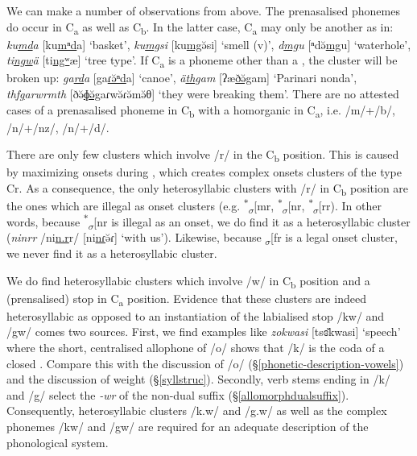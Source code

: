 
We can make a number of observations from  above. The prenasalised phonemes do occur in C\textsubscript{a} as well as C\textsubscript{b}. In the latter case, C\textsubscript{a} may only be another  as in: \emph{ku\uline{md}a} [ku\uline{mⁿd}a] `basket', \emph{ku\uline{mg}si} [ku\uline{m{\ᵑ}g}ə̆si] `smell (v)', \emph{d\uline{mg}u} [ⁿdə̆\uline{m{\ᵑ}g}u] `waterhole', \emph{ti\uline{ngw}ä} [ti\uline{n{\ᵑ}gʷ}æ] `tree type'. If C\textsubscript{a} is a phoneme other than a , the cluster will be broken up: \emph{ga\uline{rd}a} [{\ᵑ}ga\uline{ɾə̆ⁿd}a] `canoe', \emph{ä\uline{thg}am} [ʔæ\uline{ðə̆{\ᵑ}g}am] `Parinari nonda', \emph{th\uline{fg}arwrmth} [ðə̆\uline{ɸə̆{\ᵑ}g}aɾwə̆ɾə̆mə̆θ] `they were breaking them'. There are no attested cases of a prenasalised phoneme in C\textsubscript{b} with a homorganic  in C\textsubscript{a}, i.e. /m/+/b/, /n/+/nz/, /n/+/d/.%

There are only few clusters which involve /r/ in the C\textsubscript{b} position. This is caused by maximizing onsets during , which creates complex onsets clusters of the type Cr. As a consequence, the only heterosyllabic clusters with /r/ in C\textsubscript{b} position are the ones which are illegal as onset clusters (e.g. \textsuperscript{$\ast$}\textsubscript{$\sigma$}[mr, \textsuperscript{$\ast$}\textsubscript{$\sigma$}[nr, \textsuperscript{$\ast$}\textsubscript{$\sigma$}[rr). In other words, because \textsuperscript{$\ast$}\textsubscript{$\sigma$}[nr is illegal as an onset, we do find it as a heterosyllabic cluster (\emph{ninrr} /ni\uline{n.r}r/ [ni\uline{nɾ}ə̆ɾ] `with us'). Likewise, because \textsubscript{$\sigma$}[fr is a legal onset cluster, we never find it as a heterosyllabic cluster.%

We do find heterosyllabic clusters which involve /w/ in C\textsubscript{b} position and a  (prensalised) stop in  C\textsubscript{a} position. Evidence that these clusters are indeed heterosyllabic as opposed to an instantiation of the labialised  stop /kw/ and /gw/ comes two sources. First, we find examples like \emph{zokwasi} [tsɞ̆kwasi] `speech' where the short, centralised allophone of /o/ shows that /k/ is the coda of a closed . Compare this with the discussion of /o/ (\S{}\ref{phonetic-description-vowels}) and the discussion of  weight (\S{}\ref{syllstruc}). Secondly, verb stems ending in /k/ and /g/ select the \emph{-wr}  of the non-dual suffix (\S{}\ref{allomorphdualsuffix}). Consequently, heterosyllabic clusters /k.w/ and /g.w/ as well as the complex phonemes /kw/ and /gw/ are required for an adequate description of the phonological system.

